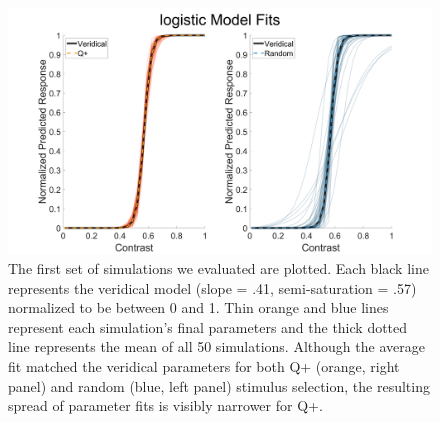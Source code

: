 \documentclass[
  man,floatsintext]{apa6}
\begin{document}
\newpage

\begin{figure}
  
  {\centering \includegraphics[width=500px]{../results/figs/fig1_7Outcomes_15Noise_12trialLength_800TR} 
  
  }
  
  \caption{The first set of simulations we evaluated are plotted. Each black line represents the veridical model (slope = .41, semi-saturation = .57) normalized to be between 0 and 1. Thin orange and blue lines represent each simulation's final parameters and the thick dotted line represents the mean of all 50 simulations. Although the average fit matched the veridical parameters for both Q+ (orange, right panel) and random (blue, left panel) stimulus selection, the resulting spread of parameter fits is visibly narrower for Q+.
\newpage}\label{fig:results-figure-firstsims-1}
  \end{figure}




\newpage
\end{document}
